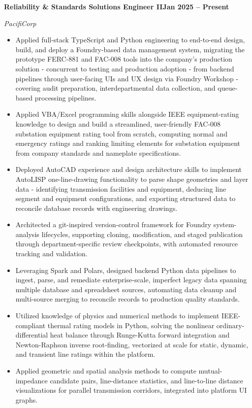 \documentclass[10pt, letterpaper]{article}
\newcommand{\jobline}[2]{%
  \vspace{5pt}%
  \noindent\textbf{#1}\hfill\textbf{#2}\par%
  \vspace{1pt}%
}
\newcommand{\subline}[1]{%
  \vspace{-1pt}%
  \noindent\textit{#1}\par%
  \vspace{1pt}%
}
\newenvironment{rlist}{%
  \begin{itemize}[leftmargin=1.4em, itemsep=1pt, topsep=2pt, parsep=0pt]%
}{%
  \end{itemize}%
}
\begin{document}
\jobline{Reliability \& Standards Solutions Engineer II}{Jan 2025 -- Present}
\subline{PacifiCorp}
\begin{rlist}
  \item Applied full-stack TypeScript and Python engineering to end-to-end design, build, and deploy a Foundry-based data management system, migrating the prototype FERC-881 and FAC-008 tools into the company's production solution - concurrent to testing and production adoption - from backend pipelines through user-facing UIs and UX design via Foundry Workshop - covering audit preparation, interdepartmental data collection, and queue-based processing pipelines.
  \item Applied VBA/Excel programming skills alongside IEEE equipment-rating knowledge to design and build a streamlined, user-friendly FAC-008 substation equipment rating tool from scratch, computing normal and emergency ratings and ranking limiting elements for substation equipment from company standards and nameplate specifications.
  \item Deployed AutoCAD experience and design architecture skills to implement AutoLISP one-line-drawing functionality to parse shape geometries and layer data - identifying transmission facilities and equipment, deducing line segment and equipment configurations, and exporting structured data to reconcile database records with engineering drawings.
  \item Architected a git-inspired version-control framework for Foundry system-analysis lifecycles, supporting cloning, modification, and staged publication through department-specific review checkpoints, with automated resource tracking and validation.
  \item Leveraging Spark and Polars, designed backend Python data pipelines to ingest, parse, and remediate enterprise-scale, imperfect legacy data spanning multiple database and spreadsheet sources, automating data cleanup and multi-source merging to reconcile records to production quality standards.
  \item Utilized knowledge of physics and numerical methods to implement IEEE-compliant thermal rating models in Python, solving the nonlinear ordinary-differential heat balance through Runge-Kutta forward integration and Newton-Raphson inverse root-finding, vectorized at scale for static, dynamic, and transient line ratings within the platform.
  \item Applied geometric and spatial analysis methods to compute mutual-impedance candidate pairs, line-distance statistics, and line-to-line distance visualizations for parallel transmission corridors, integrated into platform UI graphs.
\end{rlist}
\end{document}
